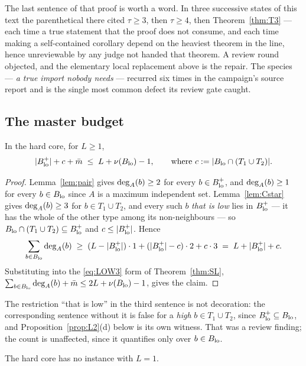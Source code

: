 The last sentence of that proof is worth a word. In three successive states of this text the
parenthetical there cited $\tau \ge 3$, then $\tau \ge 4$, then Theorem~\ref{thm:T3} --- each
time a true statement that the proof does not consume, and each time making a self-contained
corollary depend on the heaviest theorem in the line, hence unreviewable by any judge not
handed that theorem. A review round objected, and the elementary local replacement above is
the repair. The species --- \emph{a true import nobody needs} --- recurred six times in the
campaign's source report and is the single most common defect its review gate caught.

\subsection{The master budget}

\begin{theorem}\label{thm:MB}
In the hard core, for $L \ge 1$,
\[
|B_{\mathrm{lo}}^{+}| + c + \bar{m} \;\le\; L + \nu(B_{\mathrm{lo}}) - 1,
\qquad\text{where } c := |B_{\mathrm{lo}} \cap (T_1 \cup T_2)| .
\]
\end{theorem}

\begin{proof}
Lemma~\ref{lem:pair} gives $\mathrm{deg}_A(b) \ge 2$ for every $b \in B_{\mathrm{lo}}^{+}$, and
$\mathrm{deg}_A(b) \ge 1$ for every $b \in B_{\mathrm{lo}}$ since $A$ is a maximum independent set.
Lemma~\ref{lem:Cstar} gives $\mathrm{deg}_A(b) \ge 3$ for $b \in T_1 \cup T_2$, and every such $b$
\emph{that is low} lies in $B_{\mathrm{lo}}^{+}$ --- it has the whole of the other type among its
non-neighbours --- so $B_{\mathrm{lo}} \cap (T_1 \cup T_2) \subseteq B_{\mathrm{lo}}^{+}$ and $c \le |B_{\mathrm{lo}}^{+}|$.
Hence
\[
\sum_{b \in B_{\mathrm{lo}}}\mathrm{deg}_A(b) \;\ge\; (L - |B_{\mathrm{lo}}^{+}|)\cdot 1 + (|B_{\mathrm{lo}}^{+}| - c)\cdot 2
+ c \cdot 3 \;=\; L + |B_{\mathrm{lo}}^{+}| + c .
\]
Substituting into the \eqref{eq:LOW3} form of Theorem~\ref{thm:SL},
$\sum_{b\in B_{\mathrm{lo}}}\mathrm{deg}_A(b) + \bar{m} \le 2L + \nu(B_{\mathrm{lo}}) - 1$, gives the claim.
\end{proof}

The restriction ``that is low'' in the third sentence is not decoration: the corresponding
sentence without it is false for a \emph{high} $b \in T_1 \cup T_2$, since
$B_{\mathrm{lo}}^{+} \subseteq B_{\mathrm{lo}}$, and Proposition~\ref{prop:L2}(d) below is its own witness. That
was a review finding; the count is unaffected, since it quantifies only over $b \in B_{\mathrm{lo}}$.

\begin{corollary}\label{cor:L1short}
The hard core has no instance with $L = 1$.
\end{corollary}

